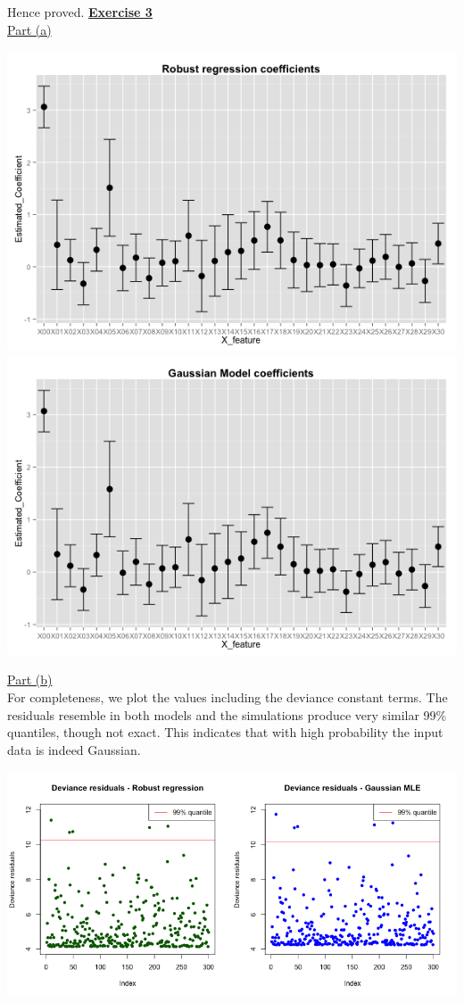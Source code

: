 \documentclass[a4paper, 11pt]{article}
\begin{document}
Hence proved.
\newpage
\textbf{\underline{Exercise 3}}\\
\newline \underline{Part (a)}\\
\begin{center}
\includegraphics[scale=0.5]{ps6_plot1_1.png}\\
\includegraphics[scale=0.5]{ps6_plot1_2.png}
\end{center}
\underline{Part (b)}\\
\newline For completeness, we plot the values including the deviance constant terms. The residuals resemble in both models and the simulations produce very similar 99\% quantiles, though not exact. This indicates that with high probability the input data is indeed Gaussian.
\begin{center}
\includegraphics[scale=0.6]{ps6_plot2.png}
\end{center}
\end{document}
